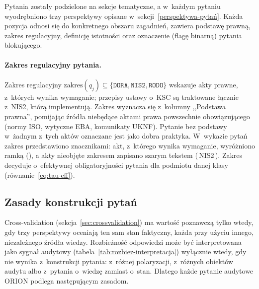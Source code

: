 Pytania zostały podzielone na sekcje tematyczne, a w~każdym pytaniu wyodrębniono trzy perspektywy opisane w~sekcji~\ref{perspektywa-pytań}. Każda pozycja odnosi się do konkretnego obszaru zagadnień, zawiera podstawę prawną, zakres regulacyjny, definicję istotności oraz oznaczenie (flagę binarną) pytania blokującego.

\paragraph{Zakres regulacyjny pytania.}
Zakres regulacyjny $\mathrm{zakres}(q_j) \subseteq \{\texttt{DORA}, \texttt{NIS2}, \texttt{RODO}\}$ wskazuje akty prawne, z~których wynika wymaganie; przepisy ustawy o~KSC są traktowane łącznie z~NIS2, którą implementują. Zakres wyznacza się z~kolumny ,,Podstawa prawna'', pomijając źródła niebędące aktami prawa powszechnie obowiązującego (normy ISO, wytyczne EBA, komunikaty UKNF). Pytanie bez podstawy w~żadnym z~tych aktów oznaczane jest jako dobra praktyka. W~wykazie pytań zakres przedstawiono znacznikami: akt, z~którego wynika wymaganie, wyróżniono ramką (), a akty nieobjęte zakresem zapisano szarym tekstem ({\scriptsize\color{gray}\,NIS2\,}). Zakres decyduje o~efektywnej obligatoryjności pytania dla podmiotu danej klasy (równanie~\eqref{eq:tau-eff}).

\subsection{Zasady konstrukcji pytań}
\label{sec:zasady-pytan}

Cross-validation (sekcja~\ref{sec:crossvalidation}) ma wartość poznawczą tylko wtedy, gdy trzy perspektywy oceniają ten sam stan faktyczny, każda przy użyciu innego, niezależnego źródła wiedzy. Rozbieżność odpowiedzi może być interpretowana jako sygnał audytowy (tabela~\ref{tab:rozbiez-interpretacja}) wyłącznie wtedy, gdy nie wynika z~konstrukcji pytania: z~różnej polaryzacji, z~różnych obiektów audytu albo z~pytania o~wiedzę zamiast o~stan. Dlatego każde pytanie audytowe ORION podlega następującym zasadom.

